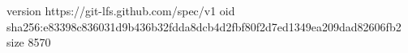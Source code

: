 version https://git-lfs.github.com/spec/v1
oid sha256:e83398c836031d9b436b32fdda8dcb4d2fbf80f2d7ed1349ea209dad82606fb2
size 8570
